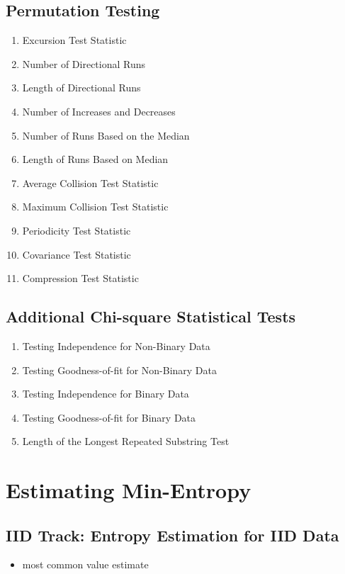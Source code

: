 \documentclass[12pt,openany]{book}
\theoremstyle{definition}
\begin{document}
\subsection*{Permutation Testing}
\begin{enumerate}
	\item Excursion Test Statistic
	\item Number of Directional Runs
	\item Length of Directional Runs
	\item Number of Increases and Decreases
	\item Number of Runs Based on the Median
	\item Length of Runs Based on Median
	\item Average Collision Test Statistic
	\item Maximum Collision Test Statistic
	\item Periodicity Test Statistic
	\item Covariance Test Statistic
	\item Compression Test Statistic
\end{enumerate}

\subsection*{Additional Chi-square Statistical Tests}
\begin{enumerate}
	\item Testing Independence for Non-Binary Data
	\item Testing Goodness-of-fit for Non-Binary Data
	\item Testing Independence for Binary Data
	\item Testing Goodness-of-fit for Binary Data
	\item Length of the Longest Repeated Substring Test
\end{enumerate}

\section*{Estimating Min-Entropy}

\subsection*{IID Track: Entropy Estimation for IID Data}
\begin{itemize}
	\item most common value estimate
\end{itemize}
\end{document}

